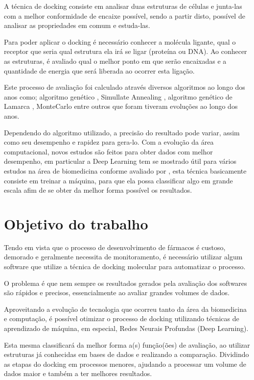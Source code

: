\documentclass[tcc, capa]{texucpel}
\begin{document}
A técnica de docking consiste em analisar duas estruturas de células e junta-las com a melhor conformidade de encaixe possível, sendo a partir disto, possível de analisar as propriedades em comum e estuda-las.

Para poder aplicar o docking é necessário conhecer a molécula ligante, qual o receptor que seria qual estrutura ela irá se ligar (proteína ou DNA). Ao conhecer as estruturas, é avaliado qual o melhor ponto em que serão encaixadas e a quantidade de energia que será liberada ao ocorrer esta ligação.

Este processo de avaliação foi calculado através diversos algoritmos ao longo dos anos como; algoritmo genético \cite{holland1975adaptation},  Simullate Annealing \cite{kirkpatrick1984optimization} ,  algoritmo genético de Lamarca \cite{morris1998automated},  MonteCarlo \cite{caflisch1992monte} entre outros que foram tiveram evoluções ao longo dos anos. 

Dependendo do algoritmo utilizado, a precisão do resultado pode variar, assim como seu desempenho e rapidez para gera-lo.
Com a evolução da área computacional, novos estudos são feitos para obter dados com melhor desempenho, em particular a Deep Learning tem se mostrado útil para vários estudos na área de biomedicina conforme avaliado por \cite{korotcov2017comparison,mamoshina2016applications}
, esta técnica basicamente consiste em treinar a máquina, para que ela possa classificar algo em grande escala afim de se obter da melhor forma possível  os resultados.


\section{Objetivo do trabalho}
Tendo em vista que o processo de desenvolvimento de fármacos é custoso, demorado e geralmente necessita de monitoramento, é necessário utilizar algum software que utilize a técnica de docking molecular para automatizar o processo.

O problema é que nem sempre os resultados gerados pela avaliação dos softwares são rápidos e precisos, essencialmente ao avaliar grandes volumes de dados.

Aproveitando a evolução de tecnologia que ocorreu tanto da área da biomedicina e computação, é possível otimizar o processo de docking utilizando técnicas de aprendizado de máquina, em especial, Redes Neurais Profundas (Deep Learning).

Esta mesma classificará da melhor forma a(s) função(ões) de avaliação, ao utilizar estruturas já conhecidas em bases de dados e realizando a comparação.
Dividindo as etapas do docking em processos menores, ajudando a processar um volume de dados maior e também a ter melhores resultados.
\end{document}
